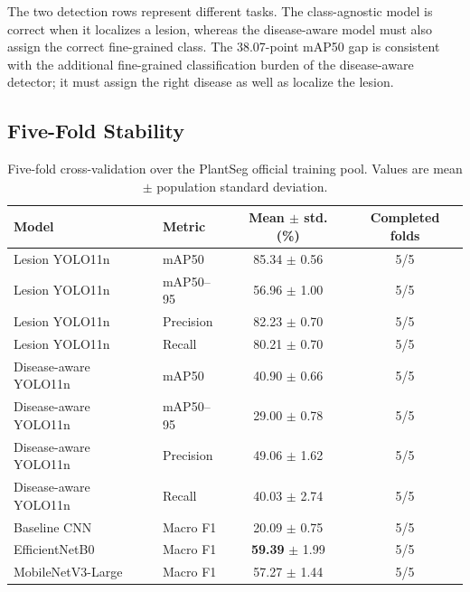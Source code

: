 \documentclass[conference]{IEEEtran}
\begin{document}
\begin{table}[t]
\caption{Detection performance on the PlantSeg test split.}
\label{tab:detection-results}
\centering
{}
\end{table}

The two detection rows represent different tasks. The class-agnostic model is correct when it
localizes a lesion, whereas the disease-aware model must also assign the correct fine-grained class.
The 38.07-point mAP50 gap is consistent with the additional fine-grained classification burden of
the disease-aware detector; it must assign the right disease as well as localize the lesion.

\subsection{Five-Fold Stability}

\begin{table}[t]
\caption{Five-fold cross-validation over the PlantSeg official training pool. Values are
mean $\pm$ population standard deviation.}
\label{tab:cv-results}
\centering
\begin{tabular}{llcc}
\toprule
Model & Metric & Mean $\pm$ std. (\%) & Completed folds \\
\midrule
Lesion YOLO11n & mAP50 & 85.34 $\pm$ 0.56 & 5/5 \\
Lesion YOLO11n & mAP50--95 & 56.96 $\pm$ 1.00 & 5/5 \\
Lesion YOLO11n & Precision & 82.23 $\pm$ 0.70 & 5/5 \\
Lesion YOLO11n & Recall & 80.21 $\pm$ 0.70 & 5/5 \\
Disease-aware YOLO11n & mAP50 & 40.90 $\pm$ 0.66 & 5/5 \\
Disease-aware YOLO11n & mAP50--95 & 29.00 $\pm$ 0.78 & 5/5 \\
Disease-aware YOLO11n & Precision & 49.06 $\pm$ 1.62 & 5/5 \\
Disease-aware YOLO11n & Recall & 40.03 $\pm$ 2.74 & 5/5 \\
Baseline CNN & Macro F1 & 20.09 $\pm$ 0.75 & 5/5 \\
EfficientNetB0 & Macro F1 & \textbf{59.39} $\pm$ 1.99 & 5/5 \\
MobileNetV3-Large & Macro F1 & 57.27 $\pm$ 1.44 & 5/5 \\
\bottomrule
\end{tabular}
\end{table}
\end{document}
